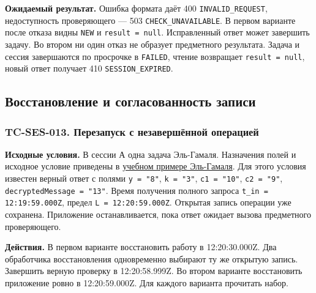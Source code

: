 \documentclass[12pt,a4paper]{article}
\begin{document}
\textbf{Ожидаемый результат.} Ошибка формата даёт 400 \texttt{INVALID\_\allowbreak{}REQUEST}, недоступность проверяющего --- 503 \texttt{CHECK\_\allowbreak{}UNAVAILABLE}. В первом варианте после отказа видны \texttt{NEW} и \texttt{result\ =\ null}. Исправленный ответ может завершить задачу. Во втором ни один отказ не образует предметного результата. Задача и сессия завершаются по просрочке в \texttt{FAILED}, чтение возвращает \texttt{result\ =\ null}, новый ответ получает 410 \texttt{SESSION\_\allowbreak{}EXPIRED}.

\subsection{Восстановление и согласованность записи}\label{ux432ux43eux441ux441ux442ux430ux43dux43eux432ux43bux435ux43dux438ux435-ux438-ux441ux43eux433ux43bux430ux441ux43eux432ux430ux43dux43dux43eux441ux442ux44c-ux437ux430ux43fux438ux441ux438}

\hypertarget{восстановление-и-согласованность-записи}{}

\subsubsection{TC-SES-013. Перезапуск с незавершённой операцией}\label{tc-ses-013-ux43fux435ux440ux435ux437ux430ux43fux443ux441ux43a-ux441-ux43dux435ux437ux430ux432ux435ux440ux448ux451ux43dux43dux43eux439-ux43eux43fux435ux440ux430ux446ux438ux435ux439}

\hypertarget{tc-ses-013-перезапуск-с-незавершённой-операцией}{}

\hypertarget{tc-ses-013}{}

\textbf{Исходные условия.} В сессии А одна задача Эль-Гамаля. Назначения полей и исходное условие приведены в {\href{../07\_Программные\_требования/DOC-06.2\_Сессии\_задач\_и\_планировщик.pdf\#учебный-пример-решения-эль-гамаля}{учебном примере Эль-Гамаля}}. Для этого условия известен верный ответ с полями \texttt{y\ =\ "8"}, \texttt{k\ =\ "3"}, \texttt{c1\ =\ "10"}, \texttt{c2\ =\ "9"}, \texttt{decrypted\allowbreak{}Message =\allowbreak{} "13"}. Время получения полного запроса \texttt{t\_\allowbreak{}in =\allowbreak{} 12:19:59.\allowbreak{}000Z}, предел \texttt{L =\allowbreak{} 12:20:59.\allowbreak{}000Z}. Открытая запись операции уже сохранена. Приложение останавливается, пока ответ ожидает вызова предметного проверяющего.

\textbf{Действия.} В первом варианте восстановить работу в 12:20:30.000Z. Два обработчика восстановления одновременно выбирают ту же открытую запись. Завершить верную проверку в 12:20:58.999Z. Во втором варианте восстановить приложение ровно в 12:20:59.000Z. Для каждого варианта прочитать набор.
\end{document}
